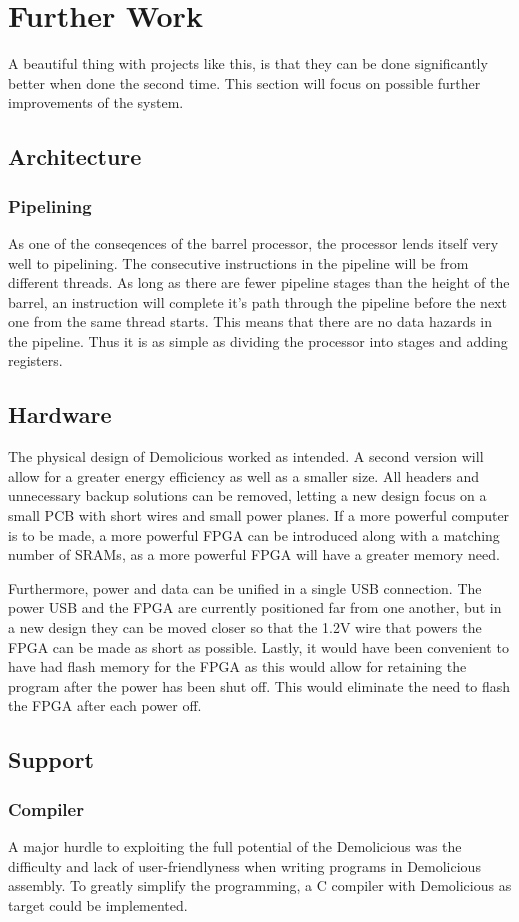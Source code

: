 \documentclass[../main/report.tex]{subfiles}
\begin{document}
\section{Further Work}

A beautiful thing with projects like this, is that they can be done significantly better when done the second time.
This section will focus on possible further improvements of the system.

\subsection{Architecture}
\subsubsection*{Pipelining}
As one of the conseqences of the barrel processor, the processor lends itself very well to pipelining.
The consecutive instructions in the pipeline will be from different threads.
As long as there are fewer pipeline stages than the height of the barrel, an instruction will complete it's path through the pipeline before the next one from the same thread starts.
This means that there are no data hazards in the pipeline. Thus it is as simple as dividing the processor into stages and adding registers.

\subsection{Hardware}
The physical design of Demolicious worked as intended.
A second version will allow for a greater energy efficiency as well as a smaller size.
All headers and unnecessary backup solutions can be removed, letting a new design focus on a small PCB with short wires and small power planes.
If a more powerful computer is to be made, a more powerful FPGA can be introduced along with a matching number of SRAMs, as a more powerful FPGA will have a greater memory need.

Furthermore, power and data can be unified in a single USB connection.
The power USB and the FPGA are currently positioned far from one another, but in a new design they can be moved closer so that the 1.2V wire that powers the FPGA can be made as short as possible.
Lastly, it would have been convenient to have had flash memory for the FPGA as this would allow for retaining the program after the power has been shut off.
This would eliminate the need to flash the FPGA after each power off.

\subsection{Support}
\subsubsection*{Compiler}
A major hurdle to exploiting the full potential of the Demolicious was the difficulty and lack of user-friendlyness when writing programs in Demolicious assembly.
To greatly simplify the programming, a C compiler with Demolicious as target could be implemented.
\end{document}
